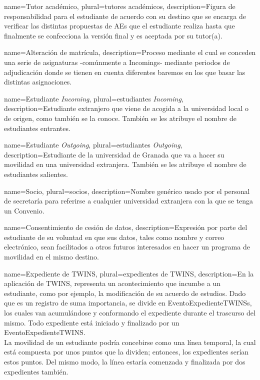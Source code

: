{
	name=Tutor académico,
	plural=tutores académicos,
	description={Figura de responsabilidad para el estudiante de acuerdo con su destino que se encarga de verificar las distintas propuestas de \glspl{AE} que el estudiante realiza hasta que finalmente se confecciona la versión final y es aceptada por su tutor(a).}
}

{
	name=Alteración de matrícula,
	description={Proceso mediante el cual se conceden una serie de asignaturas -comúnmente a \glspl{Incoming}- mediante periodos de adjudicación donde se tienen en cuenta diferentes baremos en los que basar las distintas asignaciones.}
}

{
	name=Estudiante \textit{Incoming},
	plural=estudiantes \textit{Incoming},
	description={Estudiante extranjero que viene de acogida a la universidad local o de origen, como también se la conoce. También se les atribuye el nombre de estudiantes entrantes.}
}

{
	name=Estudiante \textit{Outgoing},
	plural=estudiantes \textit{Outgoing},
	description={Estudiante de la universidad de Granada que va a hacer su movilidad en una universidad extranjera. También se les atribuye el nombre de estudiantes salientes.}
}

{
	name=Socio,
	plural=socios,
	description={Nombre genérico usado por el personal de secretaría para referirse a cualquier universidad extranjera con la que se tenga un \gls{Convenio}.}
}

{
	name=Consentimiento de cesión de datos,
	description={Expresión por parte del estudiante de su voluntad en que sus datos, tales como nombre y correo electrónico, sean facilitados a otros futuros interesados en hacer un programa de movilidad en el mismo destino.}
}

{
	name=Expediente de TWINS,
	plural=expedientes de TWINS,
	description={En la aplicación de TWINS, representa un acontecimiento que incumbe a un estudiante, como por ejemplo, la modificación de su acuerdo de estudios. Dado que es un registro de suma importancia, se divide en \glspl{EventoExpedienteTWINS}, los cuales van acumulándose y conformando el expediente durante el trascurso del mismo. Todo expediente está iniciado y finalizado por un \gls{EventoExpedienteTWINS}.\\La movilidad de un estudiante podría concebirse como una línea temporal, la cual está compuesta por unos puntos que la dividen; entonces, los expedientes serían estos puntos. Del mismo modo, la línea estaría comenzada y finalizada por dos expedientes también.}
}

